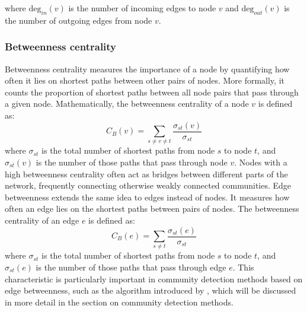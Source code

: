 where $\text{deg}_{in}(v)$ is the number 
of incoming edges to node $v$ and $\text{deg}_{out}(v)$ is the number of outgoing edges from node $v$.

\subsubsection{Betweenness centrality}
Betweenness centrality measures the importance of a node by quantifying how often it lies on 
shortest paths between other pairs of nodes. 
More formally, it counts the proportion of shortest paths between all node pairs that pass through a given node.
Mathematically, the betweenness centrality of a node $v$ is defined as:
\[C_B(v) = \sum_{s \neq v \neq t} \frac{\sigma_{st}(v)}{\sigma_{st}}\]
where $\sigma_{st}$ is the total number of shortest paths from node $s$ to node $t$, 
and $\sigma_{st}(v)$ is the number of those paths that pass through node $v$.
Nodes with a high betweenness centrality often act as bridges between different parts of the network, 
frequently connecting otherwise weakly connected communities.
Edge betweenness extends the same idea to edges instead of nodes. It measures how often an edge lies
on the shortest paths between pairs of nodes.
The betweenness centrality of an edge $e$ is defined as:
\[C_B(e) = \sum_{s \neq t} \frac{\sigma_{st}(e)}{\sigma_{st}}\]
where $\sigma_{st}$ is the total number of shortest paths from node $s$ to node $t$,
and $\sigma_{st}(e)$ is the number of those paths that pass through edge $e$.
This characteristic is particularly important in community detection methods based on edge betweenness,
 such as the algorithm introduced by \textcite{newmanandgirvan2002}, which will be discussed in more
 detail in the section on community detection methods.

